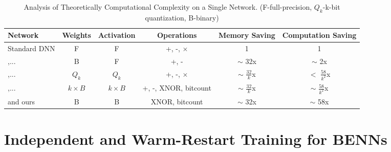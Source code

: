 \documentclass[10pt,twocolumn,letterpaper]{article}
\begin{document}
\begin{center}
    \begin{table*}
        \vspace{-3mm}
        \caption{{\small Analysis of Theoretically Computational Complexity on a Single Network. (F-full-precision, $Q_k$-k-bit quantization, B-binary)}}
        \centering
        \scriptsize
        \begin{tabular}{lccccc}
            \toprule
            \toprule
            Network & Weights & Activation & Operations & Memory Saving & Computation Saving  	\\
            \midrule
            Standard DNN &F & F & +, -, $\times$ & 1 & 1   \\
            \hline
            \cite{courbariaux2015binaryconnect,hwang2014fixed,li2016ternary,zhu2016trained,zhou2017incremental},...&B & F & +, - & $\sim$ 32x & $\sim$ 2x   \\
            \hline
            \cite{zhou2016dorefa,hubara2016quantized,wu2016quantized,anwar2015fixed},... &$Q_k$ & $Q_k$ & +, -, $\times$ & $\sim$ $\frac{32}{k}$x & $<$ $\frac{58}{k^2}$x   \\
            \hline
            \cite{lin2017towards},... &$k\times B$ & $k\times B$ & +, -, XNOR, bitcount & $\sim$ $\frac{32}{k}$x & $\sim$ $\frac{58}{k^2}$x  \\
            \hline
            \cite{rastegari2016xnor} and ours&B & B & XNOR, bitcount & $\sim$ 32x & $\sim$ 58x   \\
            \hline
            \bottomrule
        \end{tabular}
        \label{table:complex}
        \vspace{-1mm}
    \end{table*}
\end{center}

\vspace{-12mm}

\section{Independent and Warm-Restart Training for BENNs}
\label{sec:training}
\end{document}
